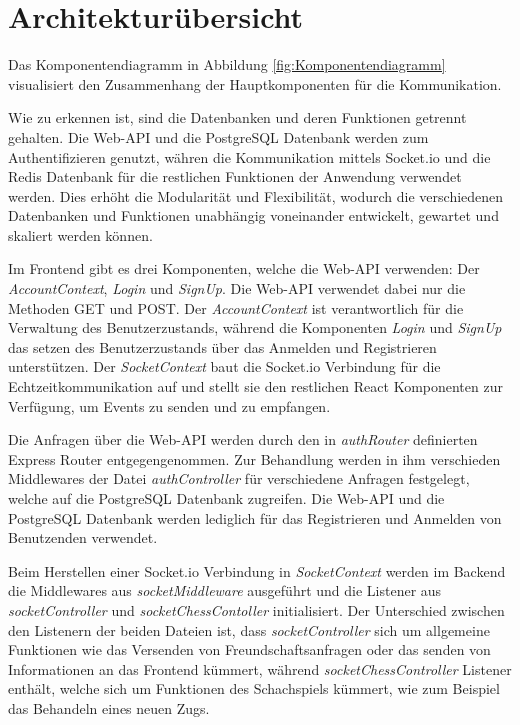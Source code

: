 \section{Architekturübersicht}
Das Komponentendiagramm in Abbildung \ref{fig:Komponentendiagramm} visualisiert den Zusammenhang der Hauptkomponenten für die Kommunikation.

Wie zu erkennen ist, sind die Datenbanken und deren Funktionen getrennt gehalten. Die Web-API und die PostgreSQL Datenbank werden zum Authentifizieren genutzt, währen die Kommunikation mittels Socket.io und die Redis Datenbank für die restlichen Funktionen der Anwendung verwendet werden. Dies erhöht die Modularität und Flexibilität, wodurch die verschiedenen Datenbanken und Funktionen unabhängig voneinander entwickelt, gewartet und skaliert werden können.

Im Frontend gibt es drei Komponenten, welche die Web-API verwenden: Der \textit{AccountContext}, \textit{Login} und \textit{SignUp}. Die Web-API verwendet dabei nur die Methoden GET und POST. Der \textit{AccountContext} ist verantwortlich für die Verwaltung des Benutzerzustands, während die Komponenten \textit{Login} und \textit{SignUp} das setzen des Benutzerzustands über das Anmelden und Registrieren unterstützen. Der \textit{SocketContext} baut die Socket.io Verbindung für die Echtzeitkommunikation auf und stellt sie den restlichen React Komponenten zur Verfügung, um Events zu senden und zu empfangen.

Die Anfragen über die Web-API werden durch den in \textit{authRouter} definierten Express Router entgegengenommen. Zur Behandlung werden in ihm verschieden Middlewares der Datei \textit{authController} für verschiedene Anfragen festgelegt, welche auf die PostgreSQL Datenbank zugreifen. Die Web-API und die PostgreSQL Datenbank werden lediglich für das Registrieren und Anmelden von Benutzenden verwendet.

Beim Herstellen einer Socket.io Verbindung in \textit{SocketContext} werden im Backend die Middlewares aus \textit{socketMiddleware} ausgeführt und die Listener aus \textit{socketController} und \textit{socketChessContoller} initialisiert. Der Unterschied zwischen den Listenern der beiden Dateien ist, dass \textit{socketController} sich um allgemeine Funktionen wie das Versenden von Freundschaftsanfragen oder das senden von Informationen an das Frontend kümmert, während \textit{socketChessController} Listener enthält, welche sich um Funktionen des Schachspiels kümmert, wie zum Beispiel das Behandeln eines neuen Zugs. 


